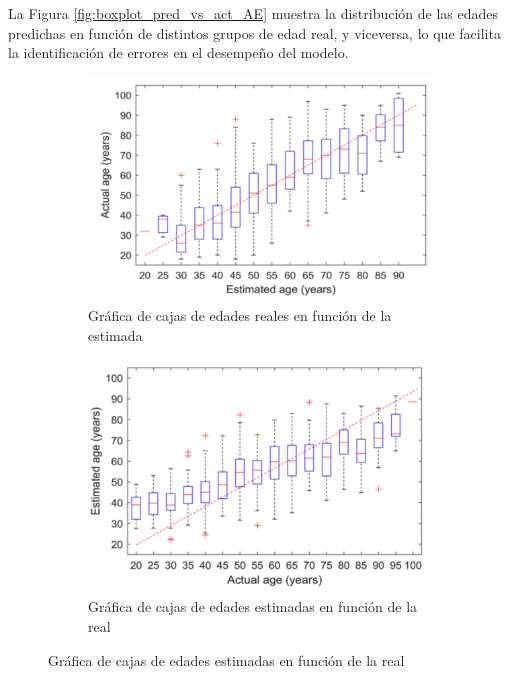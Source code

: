\begin{itemize}
    La Figura \ref{fig:boxplot_pred_vs_act_AE} muestra la distribución de las edades predichas en función de distintos 
    grupos de edad real, y viceversa, lo que facilita la identificación de errores en el desempeño del modelo.

    \begin{figure}[h]
        \centering
    
        \begin{subfigure}[b]{0.45\textwidth}
            \centering
            \includegraphics[width=\textwidth]{capitulos/cap_02/imagenes/boxplot_pred_vs_act_AE_1.png}
            \caption{Gráfica de cajas de edades reales en función de la estimada}
            \label{fig:boxplot_pred_vs_act_AE_a}
        \end{subfigure}
        \hfill
        \begin{subfigure}[b]{0.45\textwidth}
            \centering
            \includegraphics[width=\textwidth]{capitulos/cap_02/imagenes/boxplot_pred_vs_act_AE_2.png}
            \caption{Gráfica de cajas de edades estimadas en función de la real}
            \label{fig:boxplot_pred_vs_act_AE_b}
        \end{subfigure}
    

\end{figure}
\end{itemize}
